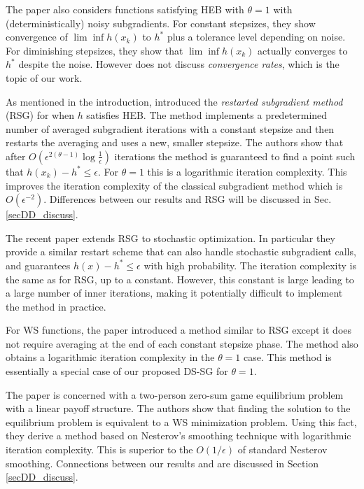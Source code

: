 \documentclass[smallextended]{svjour3}
\begin{document}
The paper \cite{nedic2010effect} also considers functions satisfying HEB with $\theta=1$ with (deterministically) noisy subgradients. For constant stepsizes, they show convergence of $\lim\inf h(x_k)$ to $h^*$ plus a tolerance level depending on noise. For diminishing stepsizes, they show that $\lim\inf h(x_k)$ actually converges to $h^*$ despite the noise. However \cite{nedic2010effect} does not discuss \emph{convergence rates}, which is the topic of our work.

As mentioned in the introduction, \cite{yang2015rsg} introduced the \emph{restarted subgradient method} (RSG) for when $h$ satisfies HEB. The method implements a predetermined number of averaged subgradient iterations with a constant stepsize and then restarts the averaging and uses a new, smaller stepsize. The authors show that after $O(\epsilon^{2(\theta-1)}\log\frac{1}{\epsilon})$ iterations the method is guaranteed to find a point such that $h(x_k)-h^*\leq\epsilon$. For $\theta=1$ this is a logarithmic iteration complexity. This improves the iteration complexity of the classical subgradient method which is $O(\epsilon^{-2})$. Differences between our results and RSG will be discussed in Sec. \ref{secDD_discuss}. 

The recent paper \cite{xu2016accelerate} extends RSG to stochastic optimization. In particular they provide a similar restart scheme that can also handle stochastic subgradient calls, and guarantees $h(x)-h^*\leq\epsilon$ with high probability. The iteration complexity is the same as for RSG, up to a constant. However, this constant is large leading to a large number of inner iterations, making it potentially difficult to implement the method in practice. 

For WS functions, the paper \cite{supittayapornpong2016staggered} introduced a method similar to RSG except it does not require averaging at the end of each constant stepsize phase. The method also obtains a logarithmic iteration complexity in the $\theta=1$ case.  This method is essentially a special case of our proposed DS-SG for $\theta=1$. 

The paper \cite{gilpin2012first} is concerned with a two-person zero-sum game equilibrium problem with a linear payoff structure. The authors show that finding the solution to the equilibrium problem is equivalent to a WS minimization problem. Using this fact, they derive a method based on Nesterov's smoothing technique with logarithmic iteration complexity. This is superior to the $O(1/\epsilon)$ of standard Nesterov smoothing. Connections between our results and \cite{gilpin2012first} are discussed in Section \ref{secDD_discuss}.  
\end{document}
